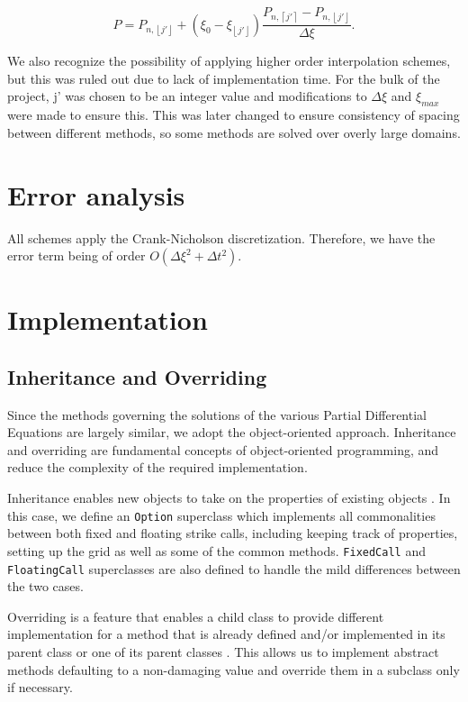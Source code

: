 \documentclass{article}
\begin{document}
\begin{equation}
  P = P_{n, \left \lfloor{j'}\right \rfloor} + (\xi_0 - \xi_{\left \lfloor{j'}\right \rfloor })\frac{P_{n, \left \lceil{j'}\right \rceil } - P_{n, \left \lfloor{j'}\right \rfloor }}{\Delta\xi}.
\end{equation}

We also recognize the possibility of applying higher order interpolation schemes, but this was ruled out due to lack of implementation time. For the bulk of the project, j' was chosen to be an integer value and modifications to \(\Delta\xi\) and \(\xi_{max}\) were made to ensure this. This was later changed to ensure consistency of spacing between different methods, so some methods are solved over overly large domains.

\section{Error analysis}
All schemes apply the Crank-Nicholson discretization. Therefore, we have the error term being of order \(O(\Delta\xi^2 + \Delta t^2)\).

\section{Implementation}

\subsection{Inheritance and Overriding}
Since the methods governing the solutions of the various Partial Differential Equations are largely similar, we adopt the object-oriented approach. Inheritance and overriding are fundamental concepts of object-oriented programming, and reduce the complexity of the required implementation.

Inheritance enables new objects to take on the properties of existing objects \cite{oop_inheritance}. In this case, we define an \texttt{Option} superclass which implements all commonalities between both fixed and floating strike calls, including keeping track of properties, setting up the grid as well as some of the common methods. \texttt{FixedCall} and \texttt{FloatingCall} superclasses are also defined to handle the mild differences between the two cases.

Overriding is a feature that enables a child class to provide different implementation for a method that is already defined and/or implemented in its parent class or one of its parent classes \cite{oop_override}. This allows us to implement abstract methods defaulting to a non-damaging value and override them in a subclass only if necessary.
\end{document}
